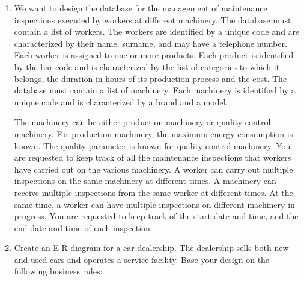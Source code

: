 \documentclass{article}
\begin{document}
\begin{enumerate}
    \item We want to design the database for the management of maintenance inspections executed by workers at different machinery. The database must contain a list of workers. The workers are identified by a unique code and are characterized by their name, surname, and may have a telephone number. Each worker is assigned to one or more products. Each product is identified by the bar code and is characterized by the list of categories to which it belongs, the duration in hours of its production process and the cost. The database must contain a list of machinery. Each machinery is identified by a unique code and is characterized by a brand and a model.

    The machinery can be either production machinery or quality control machinery. For production machinery, the maximum energy consumption is known. The quality parameter is known for quality control machinery. You are requested to keep track of all the maintenance inspections that workers have carried out on the various machinery. A worker can carry out multiple inspections on the same machinery at different times. A machinery can receive multiple inspections from the same worker at different times. At the same time, a worker can have multiple inspections on different machinery in progress. You are requested to keep track of the start date and time, and the end date and time of each inspection.

    \item Create an E-R diagram for a car dealership. The dealership sells both new and used cars and operates a service facility. Base your design on the following business rules:


\end{enumerate}
\end{document}
